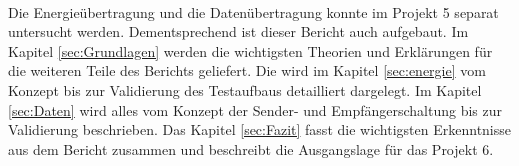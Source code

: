 \newline
\ \\ 
Die Energieübertragung und die Datenübertragung konnte im Projekt 5 separat untersucht werden. Dementsprechend ist dieser Bericht auch aufgebaut. Im Kapitel \ref{sec:Grundlagen}  werden die wichtigsten Theorien und Erklärungen für die weiteren Teile des Berichts geliefert. Die  wird im Kapitel \ref{sec:energie} vom Konzept bis zur Validierung des Testaufbaus detailliert dargelegt. Im Kapitel \ref{sec:Daten}  wird alles vom Konzept der Sender- und Empfängerschaltung bis zur Validierung beschrieben. Das Kapitel \ref{sec:Fazit}  fasst die wichtigsten Erkenntnisse aus dem Bericht zusammen und beschreibt die Ausgangslage für das Projekt 6.



